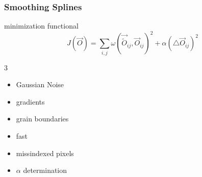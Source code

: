 \documentclass[compress,aspectratio=1610,fleqn]{beamer}
\newcommand{\checked}{\textcolor{darkgreen}{\ding{51}}}
\newcommand{\crossed}{\textcolor{darkred}{\ding{54}}}
\begin{document}
\begin{frame}
  \frametitle{Smoothing Splines}

  \begin{block}{minimization functional}
    \begin{equation*}
      J(\vec{O})
      = \sum_{i,j} \omega(\vec{\tilde O}_{ij},\vec{
          O}_{ij})^{2}
      + \alpha  (\triangle \vec{O}_{ij})^{2}
    \end{equation*}
  \end{block}


  \begin{multicols}{3}
    \begin{itemize}
    \item[\checked] Gaussian Noise
    \item[\checked] gradients
    \item[\crossed] grain boundaries
    \item[\checked] fast
    \item[\checked] missindexed pixels
    \item[\checked] $\alpha$ determination
    \end{itemize}
  \end{multicols}

  \bigskip




\end{frame}
\end{document}
